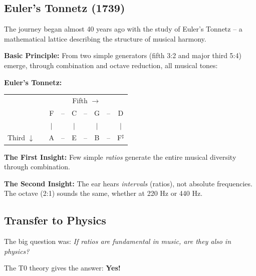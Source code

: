 \subsection{Euler's Tonnetz (1739)}

The journey began almost 40 years ago with the study of Euler's Tonnetz -- a mathematical lattice describing the structure of musical harmony.

\textbf{Basic Principle:} From two simple generators (fifth 3:2 and major third 5:4) emerge, through combination and octave reduction, all musical tones:

\textbf{Euler's Tonnetz:}
\begin{center}
	\begin{small}
		\begin{tabular}{ccccccccc}
			& & \multicolumn{7}{c}{Fifth $\rightarrow$} \\
			& & F & -- & C & -- & G & -- & D \\
			& & $\vert$ & & $\vert$ & & $\vert$ & & $\vert$ \\
			Third $\downarrow$ & & A & -- & E & -- & B & -- & F$^\sharp$ \\
		\end{tabular}
	\end{small}
\end{center}

\textbf{The First Insight:} Few simple \textit{ratios} generate the entire musical diversity through combination.

\textbf{The Second Insight:} The ear hears \textit{intervals} (ratios), not absolute frequencies. The octave (2:1) sounds the same, whether at 220 Hz or 440 Hz.

\subsection{Transfer to Physics}

The big question was: \textit{If ratios are fundamental in music, are they also in physics?}

The T0 theory gives the answer: \textbf{Yes!}

